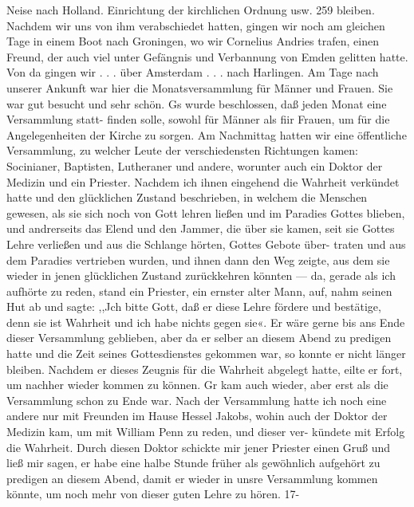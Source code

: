 Neise nach Holland. Einrichtung der kirchlichen Ordnung usw. 259
bleiben. Nachdem wir uns von ihm verabschiedet hatten, gingen
wir noch am gleichen Tage in einem Boot nach Groningen, wo
wir Cornelius Andries trafen, einen Freund, der auch viel unter
Gefängnis und Verbannung von Emden gelitten hatte.
Von da gingen wir . . . über Amsterdam . . . nach Harlingen.
Am Tage nach unserer Ankunft war hier die Monatsversammlung
für Männer und Frauen. Sie war gut besucht und sehr schön.
Gs wurde beschlossen, daß jeden Monat eine Versammlung statt-
finden solle, sowohl für Männer als fiir Frauen, um für die
Angelegenheiten der Kirche zu sorgen.
Am Nachmittag hatten wir eine öffentliche Versammlung,
zu welcher Leute der verschiedensten Richtungen kamen: Socinianer,
Baptisten, Lutheraner und andere, worunter auch ein Doktor der
Medizin und ein Priester. Nachdem ich ihnen eingehend die
Wahrheit verkündet hatte und den glücklichen Zustand beschrieben,
in welchem die Menschen gewesen, als sie sich noch von Gott
lehren ließen und im Paradies Gottes blieben, und andrerseits
das Elend und den Jammer, die über sie kamen, seit sie Gottes
Lehre verließen und aus die Schlange hörten, Gottes Gebote über-
traten und aus dem Paradies vertrieben wurden, und ihnen dann
den Weg zeigte, aus dem sie wieder in jenen glücklichen Zustand
zurückkehren könnten — da, gerade als ich aufhörte zu reden,
stand ein Priester, ein ernster alter Mann, auf, nahm seinen Hut
ab und sagte: ,,Jch bitte Gott, daß er diese Lehre fördere und
bestätige, denn sie ist Wahrheit und ich habe nichts gegen sie«.
Er wäre gerne bis ans Ende dieser Versammlung geblieben, aber
da er selber an diesem Abend zu predigen hatte und die Zeit
seines Gottesdienstes gekommen war, so konnte er nicht länger
bleiben. Nachdem er dieses Zeugnis für die Wahrheit abgelegt
hatte, eilte er fort, um nachher wieder kommen zu können. Gr
kam auch wieder, aber erst als die Versammlung schon zu Ende
war. Nach der Versammlung hatte ich noch eine andere nur mit
Freunden im Hause Hessel Jakobs, wohin auch der Doktor der
Medizin kam, um mit William Penn zu reden, und dieser ver-
kündete mit Erfolg die Wahrheit. Durch diesen Doktor schickte
mir jener Priester einen Gruß und ließ mir sagen, er habe eine
halbe Stunde früher als gewöhnlich aufgehört zu predigen an
diesem Abend, damit er wieder in unsre Versammlung kommen
könnte, um noch mehr von dieser guten Lehre zu hören.
17-

